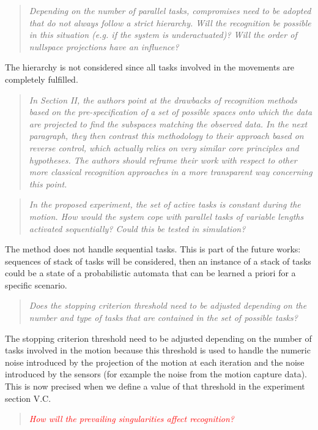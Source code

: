 \documentclass[11pt]{article}
\newcommand{\red}[1]{{\textcolor{red}{#1}}}
\begin{document}
\begin{quote}
\textit{
Depending on the number of parallel tasks, compromises need to be adopted that do not always follow a strict hierarchy. Will the recognition be possible in this situation (e.g. if the system is underactuated)? Will the order of nullspace projections have an influence?
}
\end{quote}
The hierarchy is not considered since all tasks involved in the movements are completely fulfilled.

\begin{quote}
\textit{
In Section II, the authors point at the drawbacks of recognition methods based on the pre-specification of a set of possible spaces onto which the data are projected to find the subspaces matching the observed data. In the next paragraph, they then contrast this methodology to their approach based on reverse control, which actually relies on very similar core principles and hypotheses. The authors should reframe their work with respect to other more classical recognition approaches in a more transparent way concerning this point.
}
\end{quote}

\begin{quote}
\textit{
In the proposed experiment, the set of active tasks is constant during the motion. How would the system cope with parallel tasks of variable lengths activated sequentially? Could this be tested in simulation?
}
\end{quote}
The method does not handle sequential tasks. This is part of the future works:
sequences of stack of tasks will be considered, then an instance of a stack
of tasks could be a state of a probabilistic automata that can be learned a priori for
a specific scenario. 

\begin{quote}
\textit{
Does the stopping criterion threshold need to be adjusted depending on the number and type of tasks that are contained in the set of possible tasks?
}
\end{quote}
The stopping criterion threshold need to be adjusted depending on the number of tasks involved in
the motion because this threshold is used to handle the numeric noise introduced by the
projection of the motion at each iteration and the noise introduced by the sensors (for example 
the noise from the motion capture data).\\
This is now precised when we define a value of that threshold in the experiment section V.C.

\begin{quote}
\textit{
  \red{ How will the prevailing singularities affect recognition?}
}
\end{quote}



\end{document}
